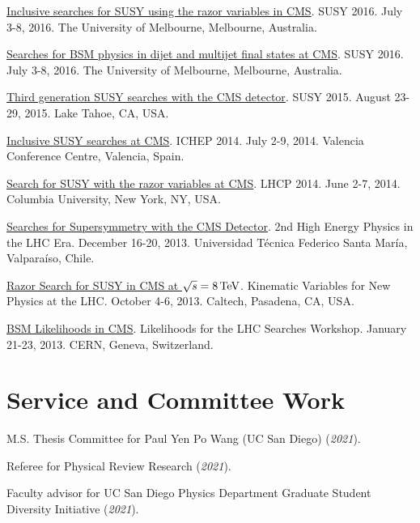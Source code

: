 \documentclass[11pt]{res}
\newif\ifext
\newenvironment{extended}{\ifext}{\fi}
\newcommand{\MarginText}[1]{\section{#1}\vspace{10pt}}
\begin{document}
\begin{resume}
\begin{extended}
\href{https://indico.cern.ch/event/443176/contributions/2148316/}{Inclusive searches for SUSY using the razor variables in CMS}. SUSY 2016. July 3-8, 2016. The University of Melbourne, Melbourne, Australia.

\href{https://indico.cern.ch/event/443176/contributions/2154549/}{Searches for BSM physics in dijet and multijet final states at CMS}. SUSY 2016. July 3-8, 2016. The University of Melbourne, Melbourne, Australia.

\href{https://indico.cern.ch/event/331032/contributions/1720249/}{Third generation SUSY searches with the CMS detector}. SUSY 2015. August 23-29, 2015. Lake Tahoe, CA, USA.

\href{https://indico.ific.uv.es/indico/contributionDisplay.py?sessionId=24&contribId=289&confId=2025}{Inclusive SUSY searches at CMS}. ICHEP 2014. July 2-9, 2014. Valencia Conference Centre, Valencia, Spain.

\href{https://indico.cern.ch/event/279518/contributions/634785/}{Search for SUSY with the razor variables at CMS}. LHCP 2014. June 2-7, 2014. Columbia University, New York, NY, USA.

\href{https://indico.cern.ch/event/252857/contributions/1579321/}{Searches for Supersymmetry with the CMS Detector}. 2nd High Energy Physics in the LHC Era. December 16-20, 2013. Universidad T\'{e}cnica Federico Santa Mar\'{i}a, Valpara\'{i}so, Chile.

\href{https://indico.cern.ch/event/261650/contributions/586374/}{Razor Search for SUSY in CMS at $\sqrt{s}=8\,\text{Te\hspace{-.08em}V}$}. Kinematic Variables for New Physics at the LHC. October 4-6, 2013. Caltech, Pasadena, CA, USA.

\href{https://indico.cern.ch/event/218693/contributions/1520333/}{BSM Likelihoods in CMS}. Likelihoods for the LHC Searches Workshop. January 21-23, 2013. CERN, Geneva, Switzerland.

\end{extended}


\MarginText{Service and Committee Work}

M.S. Thesis Committee for Paul Yen Po Wang (UC San Diego) (\textit{2021}).

Referee for Physical Review Research (\textit{2021}).

Faculty advisor for UC San Diego Physics Department Graduate Student Diversity Initiative (\textit{2021}).


\end{resume}
\end{document}
